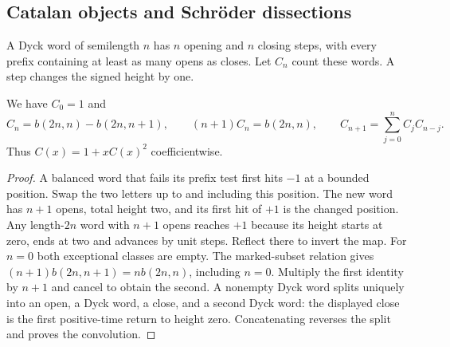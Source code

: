 \subsection{Catalan objects and Schr\"oder dissections}
A Dyck word of semilength $n$ has $n$ opening and $n$ closing steps, with
every prefix containing at least as many opens as closes. Let $C_n$ count
these words. A step changes the signed height by one.
\begin{theorem}\label{result10}
We have $C_0=1$ and
\[
 C_n=b(2n,n)-b(2n,n+1),\qquad
 (n+1)C_n=b(2n,n),\qquad
 C_{n+1}=\sum_{j=0}^n C_j C_{n-j}.
\]
Thus $C(x)=1+xC(x)^2$ coefficientwise.
\end{theorem}
\begin{proof}
A balanced word that fails its prefix test first hits $-1$ at a bounded
position. Swap the two letters up to and including this position. The
new word has $n+1$ opens, total height two, and its first hit of $+1$ is
the changed position. Any length-$2n$ word with $n+1$ opens reaches $+1$
because its height starts at zero, ends at two and advances by unit steps.
Reflect there to invert the map. For $n=0$ both exceptional classes are
empty. The marked-subset relation gives
$(n+1)b(2n,n+1)=n b(2n,n)$, including $n=0$. Multiply the first identity
by $n+1$ and cancel to obtain the second. A nonempty Dyck word splits
uniquely into an open, a Dyck word, a close, and a second Dyck word:
the displayed close is the first positive-time return to height zero.
Concatenating reverses the split and proves the convolution.
\end{proof}

